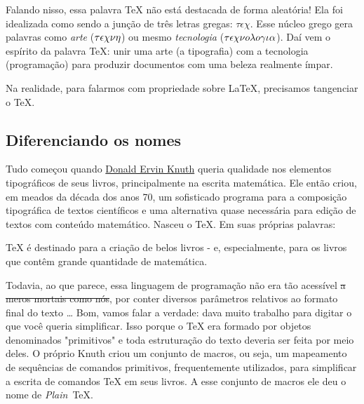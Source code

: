 Falando nisso, essa palavra \TeX{} não está destacada de forma aleatória! 
Ela foi idealizada como sendo a junção de três letras gregas: $\tau\epsilon\chi$.
Esse núcleo grego gera palavras como \textit{arte} ($\small\tau\epsilon\chi\nu\eta$) 
ou mesmo \textit{tecnologia} ($\small\tau\epsilon\chi\nu o \lambda o \gamma\iota\alpha$).
Daí vem o espírito da palavra \TeX: unir uma arte (a tipografia) com a tecnologia 
(programação) para produzir documentos com uma beleza realmente ímpar.

Na realidade, para falarmos com propriedade sobre \LaTeX, precisamos tangenciar 
o \TeX.

\subsection{Diferenciando os nomes} %

Tudo começou quando \href{https://pt.wikipedia.org/wiki/Donald_Knuth}{Donald Ervin Knuth} 
queria qualidade nos elementos tipográficos de seus livros, principalmente na 
escrita matemática. 
Ele então criou, em meados da década dos anos 70, um sofisticado programa para a 
composição tipográfica de textos científicos e uma alternativa quase necessária 
para edição de textos com conteúdo matemático. 
Nasceu o \TeX. 
Em suas próprias palavras:

\begin{cita}
  \TeX{} é destinado para a criação de belos livros - e, especialmente, para os 
  livros que contêm grande quantidade de matemática.
\end{cita}

Todavia, ao que parece, essa linguagem de programação não era tão acessível 
\sout{a meros mortais como nós}, por conter diversos parâmetros relativos ao 
formato final do texto \ldots
Bom, vamos falar a verdade: dava muito trabalho para digitar o que você queria 
simplificar.
Isso porque o \TeX{} era formado por objetos denominados "primitivos" e toda 
estruturação do texto deveria ser feita por meio deles.
O próprio Knuth criou um conjunto de macros, ou seja, um mapeamento de sequências de comandos primitivos, frequentemente 
utilizados, para simplificar a escrita de comandos \TeX{} em seus livros.
A esse conjunto de macros ele deu o nome de \textit{Plain}~\TeX.

